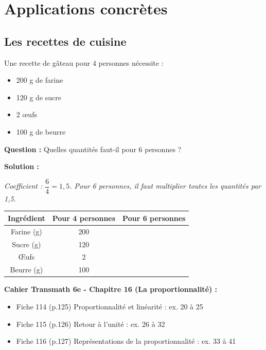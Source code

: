 \section{Applications concrètes}

\subsection{Les recettes de cuisine}

\begin{applicationbox}
	Une recette de gâteau pour 4 personnes nécessite :
	\begin{itemize}
		\item 200 g de farine
		\item 120 g de sucre
		\item 2 œufs
		\item 100 g de beurre
	\end{itemize}

	\textbf{Question :} Quelles quantités faut-il pour 6 personnes ?

	\textbf{Solution :}

	\textit{Coefficient : $\dfrac{6}{4} = 1,5$. Pour 6 personnes, il faut multiplier toutes les quantités par 1,5.}

	\begin{center}
		\renewcommand{\arraystretch}{1.5}
		\begin{tabular}{|c|c|c|}
			\hline
			\textbf{Ingrédient} & \textbf{Pour 4 personnes} & \textbf{Pour 6 personnes} \\
			\hline
			Farine (g) & 200 & \solution{$200 \times 1,5 = 300$} \\
			\hline
			Sucre (g) & 120 & \solution{$120 \times 1,5 = 180$} \\
			\hline
			Œufs & 2 & \solution{$2 \times 1,5 = 3$} \\
			\hline
			Beurre (g) & 100 & \solution{$100 \times 1,5 = 150$} \\
			\hline
		\end{tabular}
	\end{center}
\end{applicationbox}

\begin{remarkbox}
	\textbf{Cahier Transmath 6e - Chapitre 16 (La proportionnalit\'e) :}
	\begin{itemize}
		\item Fiche 114 (p.125) \og Proportionnalit\'e et lin\'earit\'e\fg{} : ex. 20 \`a 25
		\item Fiche 115 (p.126) \og Retour \`a l'unit\'e\fg{} : ex. 26 \`a 32
		\item Fiche 116 (p.127) \og Repr\'esentations de la proportionnalit\'e\fg{} : ex. 33 \`a 41
	\end{itemize}
\end{remarkbox}


